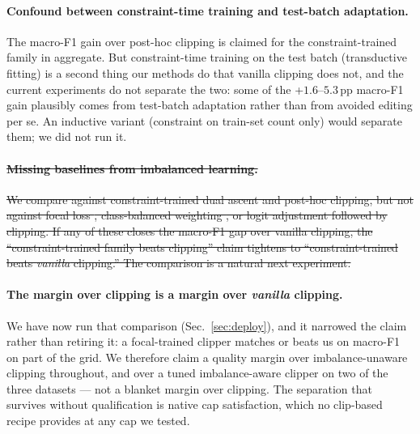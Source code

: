 \documentclass[10pt]{article}
\newcommand{\del}[1]{{\color{red}\sout{#1}}}
\begin{document}
\paragraph{Confound between constraint-time training and test-batch
adaptation.} The macro-F1 gain over post-hoc clipping is claimed for the
constraint-trained family in aggregate. But constraint-time training on
the test batch (transductive fitting) is a second thing our methods do
that vanilla clipping does not, and the current experiments do not
separate the two: some of the +$1.6$--$5.3$\,pp macro-F1 gain plausibly
comes from test-batch adaptation rather than from avoided editing per
se. An inductive variant (constraint on train-set count only) would
separate them; we did not run it.

\paragraph{\del{Missing baselines from imbalanced learning.}}\leavevmode
\del{We compare against constraint-trained dual ascent and post-hoc clipping,
but not against focal loss \mbox{\citep{lin2017focal}}, class-balanced weighting
\mbox{\citep{cui2019class}}, or logit adjustment \mbox{\citep{menon2020long}} followed
by clipping. If any of these closes the macro-F1 gap over vanilla
clipping, the ``constraint-trained family beats clipping'' claim
tightens to ``constraint-trained beats \emph{vanilla} clipping.''
The comparison is a natural next experiment.}

{\color{blue}
\paragraph{The margin over clipping is a margin over \emph{vanilla} clipping.}
We have now run that comparison (Sec.~\ref{sec:deploy}), and it narrowed the claim
rather than retiring it: a focal-trained clipper matches or beats us on macro-F1 on
part of the grid. We therefore claim a quality margin over imbalance-unaware
clipping throughout, and over a tuned imbalance-aware clipper on two of the three
datasets --- not a blanket margin over clipping. The separation that survives
without qualification is native cap satisfaction, which no clip-based recipe
provides at any cap we tested.}
\end{document}
